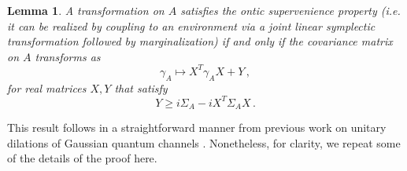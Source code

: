\documentclass[pra,superscriptaddress,nofootinbib,12pt]{revtex4-2}
\newtheorem{lemma}[theorem]{Lemma}
\begin{document}
\begin{lemma}\label{lemma:irreversible}
A transformation on $A$ satisfies the ontic supervenience property (i.e. it can be realized by coupling to an environment via a joint linear symplectic transformation followed by marginalization) if and only if the covariance matrix on $A$ transforms as
\begin{equation} \label{eq:howCMevolves}
  \gamma_A \mapsto X^T \gamma_A X + Y\,,
\end{equation}
for real matrices $X,Y$ that satisfy
\begin{equation}
  \label{eq:XYcondition}
  Y \geq i\Sigma_A - i X^T \Sigma_A X \,.
\end{equation}
\end{lemma}


This result follows in a straightforward manner from previous work on unitary dilations of Gaussian quantum channels \cite{Caruso}. Nonetheless, for clarity, we repeat some of the details of the proof here.
\end{document}
